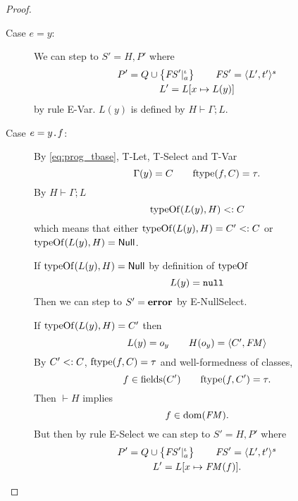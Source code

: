\begin{proof}
\begin{description}
\begin{description}
        \item[Case $e = y$:]
          We can step to $S' = H, P'$ where
          \begin{equation*}
            \begin{gathered}
              P' = Q \cup \left\{\mathit{FS}'|_a^\iota \right\} \quad\quad \mathit{FS}' = \mbox{$\langle L',
              t' \rangle^s$} \\
              L' = L[x \mapsto L(y)]
            \end{gathered}
          \end{equation*}
          by rule {\sc E-Var}. $L(y)$ is defined by $H \vdash \Gamma;L$. \contradiction

        \item[Case $e = \mbox{\mdseries$y$\texttt{.}$f$}$:]
          By \eqref{eq:prog_tbase}, {\sc T-Let}, {\sc T-Select} and {\sc T-Var}
          \begin{equation*}
            \Gamma(y) = C \quad\quad \mbox{$\mathrm{ftype}$}(f, C) = \tau.
          \end{equation*}
          By $H \vdash \Gamma;L$
          \begin{equation*}
            \mbox{$\mathrm{typeOf}$}(L(y), H) <: C
          \end{equation*}
          which means that either $\mbox{$\mathrm{typeOf}$}(L(y), H) = C' <: C$ or \\
          $\mbox{$\mathrm{typeOf}$}(L(y), H) = \mbox{$\mathsf{Null}$}$. 
          
          If $\mbox{$\mathrm{typeOf}$}(L(y), H) = \mbox{$\mathsf{Null}$}$ by definition of $\mbox{$\mathrm{typeOf}$}$
          \begin{equation*}
            L(y) = \mbox{\mdseries\texttt{null}}
          \end{equation*}
          Then we can step to $S' = \mbox{{\bf error}}$ by {\sc E-NullSelect}.
          \contradiction

          If $\mbox{$\mathrm{typeOf}$}(L(y), H) = C'$ then
          \begin{equation*}
            L(y) = o_y \quad\quad H(o_y) = \mbox{$\langle C', \mathit{FM} \rangle$}
          \end{equation*}
          By $C' <: C$, $\mbox{$\mathrm{ftype}$}(f, C) = \tau$ and well-formedness of
          classes,
          \begin{equation*}
            f \in \mbox{$\mathrm{fields}$}(C') \quad\quad \mbox{$\mathrm{ftype}$}(f, C') = \tau.
          \end{equation*}
          Then $\vdash H$ implies
          \begin{equation*}
            f \in \mbox{$\mathrm{dom}$}(\mathit{FM}).
          \end{equation*}
          But then by rule {\sc E-Select} we can step to $S' = H, P'$ where
          \begin{equation*}
            \begin{gathered}
              P' = Q \cup \left\{\mathit{FS}'|_a^\iota \right\} \quad\quad \mathit{FS}' = \mbox{$\langle L',
              t' \rangle^s$} \\
              L' = L[x \mapsto \mathit{FM}(f)].
            \end{gathered}
          \end{equation*}
          \contradiction


\end{description}
\end{description}
\end{proof}
